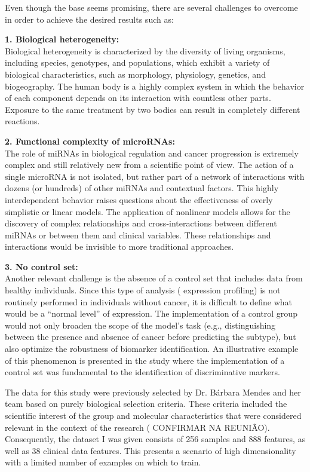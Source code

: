 Even though the base seems promising, there are several challenges to overcome
in order to achieve the desired results such as:

\textbf{1. Biological heterogeneity:} \\
\label{sec:biological-heterogeneity}
Biological heterogeneity is characterized by the diversity of living organisms,
including species, genotypes, and populations, which exhibit a variety of
biological characteristics, such as morphology, physiology, genetics, and biogeography.
The human body is a highly complex system in which the behavior of each
component depends on its interaction with countless other parts.
Exposure to the same treatment by two bodies can result in completely different
reactions.

\textbf{2. Functional complexity of microRNAs:} \\
The role of \gls{miRNAs} in biological regulation and cancer progression is
extremely complex and still relatively new from a scientific point of view.
The action of a single microRNA is not isolated, but rather part of a network
of interactions with dozens (or hundreds) of other \gls{miRNAs} and contextual
factors. This highly interdependent behavior raises questions about the
effectiveness of overly simplistic or linear models. The application of
nonlinear models allows for the discovery of complex relationships and
cross-interactions between different \gls{miRNAs} or between them and clinical
variables. These relationships and interactions would be invisible to more
traditional approaches.

\textbf{3. No control set:} \\
Another relevant challenge is the absence of a control set that includes data
from healthy individuals. Since this type of analysis ( expression
profiling) is not routinely performed in individuals without cancer, it is
difficult to define what would be a “normal level” of expression. The
implementation of a control group would not only broaden the scope of the
model's task (e.g., distinguishing between the presence and absence of cancer
before predicting the subtype), but also optimize the robustness of biomarker
identification. An illustrative example of this phenomenon is presented in the
study \textcite{ml_gastric_Azari2023} where the implementation of a control set 
was fundamental to the identification of discriminative markers.

The data for this study were previously selected by Dr. Bárbara Mendes and her
team based on purely biological selection criteria. These criteria included the
scientific interest of the group and molecular characteristics that were
considered relevant in the context of the research ( CONFIRMAR NA REUNIÃO).
Consequently, the dataset I was given consists of 256 samples and 888
 features, as well as 38 clinical data features. This presents
a scenario of high dimensionality with a limited number of examples on which to
train.

